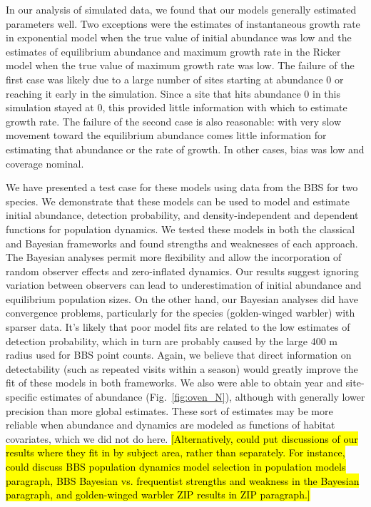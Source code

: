 \documentclass[12pt]{article}
\begin{document}
In our analysis of simulated data, we found that our models generally estimated parameters well.
Two exceptions were the estimates of instantaneous growth rate in exponential model when the 
true value of initial abundance was low and the estimates of equilibrium abundance and maximum
growth rate in the Ricker model when the true value of maximum growth rate was low.  
The failure of the first case was likely due to a large number of sites starting at abundance 0 or reaching it early in the simulation.  
Since a site that hits abundance 0 in this simulation stayed at 0, this provided little information with
which to estimate growth rate.  The failure of the second case is also reasonable: with very
slow movement toward the equilibrium abundance comes little information for estimating
that abundance or the rate of growth.  In other cases, bias was low and coverage nominal.

We have presented a test case for these models using data from
the BBS for two species. We demonstrate that these models can be
used to model and estimate initial abundance, detection
probability, and density-independent and dependent functions for
population dynamics. We tested these models in both the
classical and Bayesian frameworks and found strengths and
weaknesses of each approach. The Bayesian analyses permit more
flexibility and allow the incorporation of random observer
effects and zero-inflated dynamics. Our results suggest ignoring
variation between observers can lead to underestimation of
initial abundance and equilibrium population sizes. On the other
hand, our Bayesian analyses did have convergence problems,
particularly for the species (golden-winged warbler) with sparser data. It's
likely that poor model fits are related to the low estimates of
detection probability, which in turn are probably caused by the
large 400 m radius used for BBS point counts. Again, we believe
that direct information on detectability (such as repeated
visits within a season) would greatly improve the fit of these
models in both frameworks.  We also were able to obtain year
and site-specific estimates of abundance (Fig.~\ref{fig:oven_N}),
although with generally lower precision than more global estimates.  These sort of estimates
may be more reliable when abundance and dynamics are modeled 
as functions of habitat covariates, which we did not do here.
\hl{[Alternatively, could put discussions of our results where
they fit in by subject area, rather than separately. For
instance, could discuss BBS population dynamics model selection
in population models paragraph, BBS Bayesian vs.
frequentist strengths and weakness in the Bayesian paragraph, 
and golden-winged warbler ZIP results in ZIP
paragraph.]}
\end{document}
